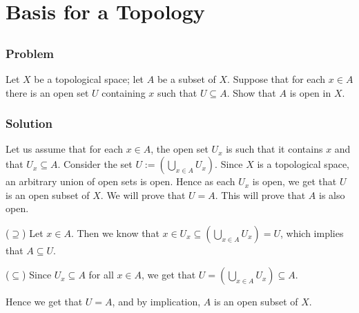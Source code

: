 \setcounter{section}{12} %
\section{Basis for a Topology}
\label{sec-topspace-basis}


\setcounter{subsection}{0} %
\subsection{}

\subsubsection{Problem}
Let $X$ be a topological space; let $A$ be a subset of $X$. Suppose that for each $x \in A$ there is an open set $U$ containing $x$ such that $U \subseteq A$. Show that $A$ is open in $X$.

\subsubsection{Solution}
Let us assume that for each $x \in A$, the open set $U_x$ is such that it contains $x$ and that $U_x \subseteq A$. Consider the set $U := \left( \bigcup_{x \in A}U_x \right)$. Since $X$ is a topological space, an arbitrary union of open sets is open. Hence as each $U_x$ is open, we get that $U$ is an open subset of $X$. We will prove that $U = A$. This will prove that $A$ is also open.

($\supseteq$) Let $x \in A$. Then we know that $x \in U_x \subseteq \left( \bigcup_{x \in A}U_x \right) = U$, which implies that $A \subseteq U$.

($\subseteq$) Since $U_x \subseteq A$ for all $x \in A$, we get that $U = \left( \bigcup_{x \in A}U_x \right) \subseteq A$.

Hence we get that $U = A$, and by implication, $A$ is an open subset of $X$.